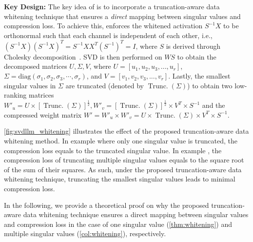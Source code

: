 \textbf{Key Design:}
The key idea of \sysname is to incorporate a truncation-aware data whitening technique that ensures a \textit{direct} mapping between singular values and compression loss. To achieve this, \sysname enforces the whitened activation $S^{-1}X$ to be orthonormal such that each channel is independent of each other, i.e., $(S^{-1}X)(S^{-1}X)^T= S^{-1}XX^T(S^{-1})^T =I$, where $S$ is derived through Cholesky decomposition~\citep{DBLP:books/siam/Meyer00}. 
%
SVD is then performed on $WS$ to obtain the decomposed matrices $U, \Sigma, V$, where $U=[u_1,u_2,u_3,...,u_r]$, $\Sigma=\text{diag}(\sigma_1,\sigma_2,\sigma_3, \cdots, \sigma_r)$, and $V=[v_1,v_2,v_3,...,v_r]$. Lastly, the smallest singular values in $\Sigma$ are truncated (denoted by $\boldsymbol{\operatorname{Trunc.}}(\Sigma)$) to obtain two low-ranking matrices $W'_u = U\times [\boldsymbol{\operatorname{Trunc.}}(\Sigma)] ^\frac{1}{2}, W'_v = [\boldsymbol{\operatorname{Trunc.}}(\Sigma)] ^\frac{1}{2}\times  V^T \times S^{-1}$ and the compressed weight matrix $W' = W'_u \times W'_v = U \times \boldsymbol{\operatorname{Trunc.}}(\Sigma) \times V^T \times S^{-1}$. 
%

\cref{fig:svdllm_whitening} illustrates the effect of the proposed truncation-aware data whitening method. In example  where only one singular value is truncated, the compression loss equals to the truncated singular value. In example , the compression loss of truncating multiple singular values equals to the square root of the sum of their squares. As such, under the proposed truncation-aware data whitening technique, truncating the smallest singular values leads to minimal compression loss.

In the following, we provide a theoretical proof on why the proposed  truncation-aware data whitening technique ensures a direct mapping between singular values and compression loss in the case of one singular value (\cref{thm:whitening}) and multiple singular values (\cref{col:whitening}), respectively.


